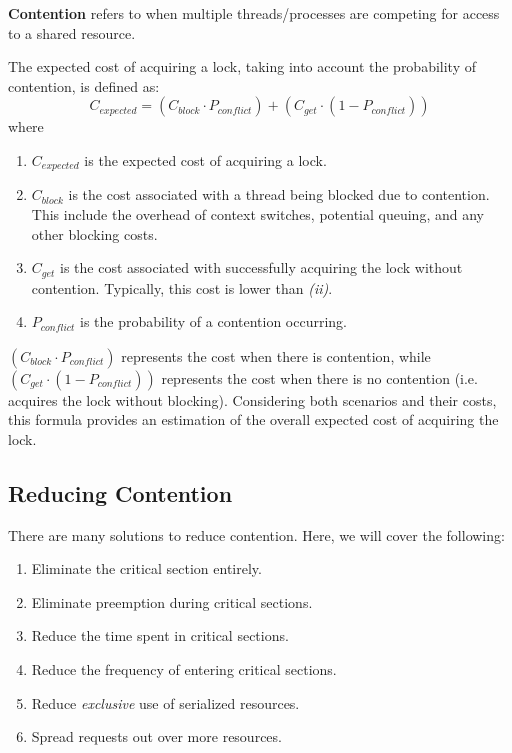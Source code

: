 \documentclass{report}
\newcommand{\definitionBegin}[1]{\begin{tcolorbox}[title={Definition: #1}]}
\newcommand{\definitionEnd}{\end{tcolorbox}}
\begin{document}
\definitionBegin{Contention}
\textbf{Contention} refers to when multiple threads/processes are competing for access to a shared
resource. 
\definitionEnd

The expected cost of acquiring a lock, taking into account the probability of contention, is defined as:
\[C_\textit{expected} = (C_\textit{block} \cdot P_\textit{conflict}) + (C_\textit{get} \cdot (1 -
  P_\textit{conflict}))\]
where

\begin{enumerate}[label=\textit{(\roman*)}]
\item $C_\textit{expected}$ is the expected cost of acquiring a lock.
\item $C_\textit{block}$ is the cost associated with a thread being blocked due to contention. This
  include the overhead of context switches, potential queuing, and any other blocking costs.
\item $C_\textit{get}$ is the cost associated with successfully acquiring the lock without
  contention. Typically, this cost is lower than \textit{(ii)}.
\item $P_\textit{conflict}$ is the probability of a contention occurring.
\end{enumerate}
$(C_\textit{block} \cdot P_\textit{conflict})$ represents the cost when there is contention, while
$(C_\textit{get} \cdot (1 - P_\textit{conflict}))$ represents the cost when there is no contention
(i.e. acquires the lock without blocking). Considering both scenarios and their costs, this formula
provides an estimation of the overall expected cost of acquiring the lock.


\subsection{Reducing Contention}
There are many solutions to reduce contention. Here, we will cover the following:
\begin{enumerate}[label=\textit{(\roman*)}]
\item Eliminate the critical section entirely.
\item Eliminate preemption during critical sections.
\item Reduce the time spent in critical sections.
\item Reduce the frequency of entering critical sections.
\item Reduce \textit{exclusive} use of serialized resources.
\item Spread requests out over more resources.
\end{enumerate}
\end{document}
